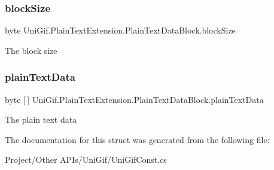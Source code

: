 \subsubsection{\texorpdfstring{block\+Size}{blockSize}}
{\footnotesize\ttfamily byte Uni\+Gif.\+Plain\+Text\+Extension.\+Plain\+Text\+Data\+Block.\+block\+Size}



The block size 

\mbox{\label{struct_uni_gif_1_1_plain_text_extension_1_1_plain_text_data_block_ac21ffc57510bdeb700b8350fffe230ca}} 
\subsubsection{\texorpdfstring{plain\+Text\+Data}{plainTextData}}
{\footnotesize\ttfamily byte \mbox{[}$\,$\mbox{]} Uni\+Gif.\+Plain\+Text\+Extension.\+Plain\+Text\+Data\+Block.\+plain\+Text\+Data}



The plain text data 



The documentation for this struct was generated from the following file\+:\begin{DoxyCompactItemize}
\item 
Project/\+Other A\+P\+Is/\+Uni\+Gif/Uni\+Gif\+Const.\+cs\end{DoxyCompactItemize}
